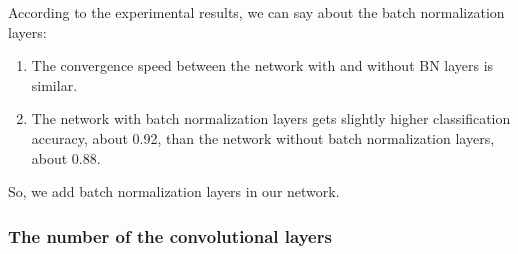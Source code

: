 According to the experimental results, we can say about the  batch normalization layers: 
\begin{enumerate}
	\item The convergence speed between the network with and without BN layers is similar.
	\item The network with batch normalization layers gets slightly higher classification accuracy, about 0.92, than the network without batch normalization layers, about 0.88.
\end{enumerate}
So, we add batch normalization layers in our network. 

\subsubsection{The number of the convolutional layers}
